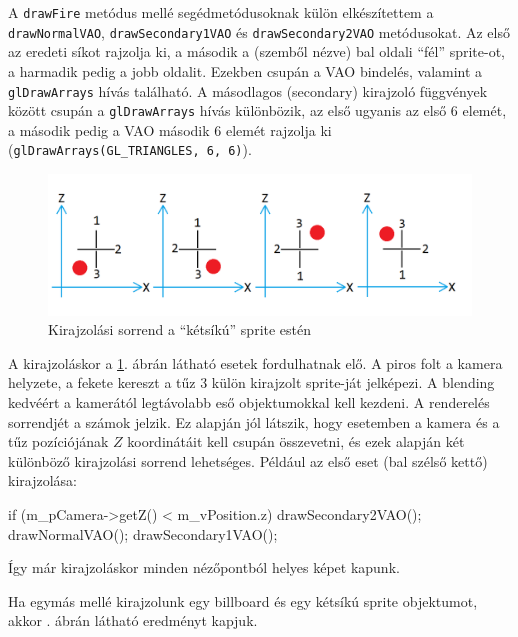 A \texttt{drawFire} metódus mellé segédmetódusoknak külön elkészítettem a \texttt{drawNormalVAO}, \texttt{drawSecondary1VAO} és \texttt{drawSecondary2VAO} metódusokat. Az első az eredeti síkot rajzolja ki, a második a (szemből nézve) bal oldali ``fél'' sprite-ot, a harmadik pedig a jobb oldalit. Ezekben csupán a VAO bindelés, valamint a \texttt{glDrawArrays} hívás található. A másodlagos (secondary) kirajzoló függvények között csupán a \texttt{glDrawArrays} hívás különbözik, az első ugyanis az első 6 elemét, a második pedig a VAO második 6 elemét rajzolja ki (\texttt{glDrawArrays(GL\_TRIANGLES, 6, 6)}). 

\begin{figure}[h]
 \centering
 \includegraphics[width=\textwidth]{kepek/billboardSorting.png}
 \caption{Kirajzolási sorrend a ``kétsíkú'' sprite estén}
 \label{fig:spriteSorting}
\end{figure}
A kirajzoláskor a \ref{fig:spriteSorting}. ábrán látható esetek fordulhatnak elő. A piros folt a kamera helyzete, a fekete kereszt a tűz 3 külön kirajzolt sprite-ját jelképezi. A blending kedvéért a kamerától legtávolabb eső objektumokkal kell kezdeni. A renderelés sorrendjét a számok jelzik. Ez alapján jól látszik, hogy esetemben a kamera és a tűz pozíciójának $Z$ koordinátáit kell csupán összevetni, és ezek alapján két különböző kirajzolási sorrend lehetséges. 
Például az első eset (bal szélső kettő) kirajzolása: 
\begin{cpp}
if (m_pCamera->getZ() < m_vPosition.z)
{
	drawSecondary2VAO();
	drawNormalVAO();
	drawSecondary1VAO();
}
\end{cpp}
Így már kirajzoláskor minden nézőpontból helyes képet kapunk.

Ha egymás mellé kirajzolunk egy billboard és egy kétsíkú sprite objektumot, akkor . ábrán látható eredményt kapjuk.

